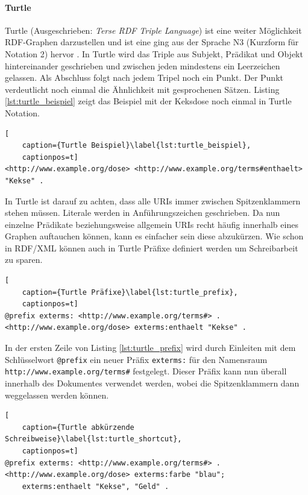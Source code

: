 \paragraph{Turtle} %
\label{par:turtle}

Turtle (Ausgeschrieben: \emph{Terse RDF Triple Language}) ist eine weiter Möglichkeit RDF-Graphen darzustellen und ist eine ging aus der Sprache N3 (Kurzform für Notation 2) hervor \cite{DavidBeckett}. In Turtle wird das Triple aus Subjekt, Prädikat und Objekt hintereinander geschrieben und zwischen jeden mindestens ein Leerzeichen gelassen. Als Abschluss folgt nach jedem Tripel noch ein Punkt. Der Punkt verdeutlicht noch einmal die Ähnlichkeit mit gesprochenen Sätzen. Listing \ref{lst:turtle_beispiel} zeigt das Beispiel mit der Keksdose noch einmal in Turtle Notation. 

\begin{lstlisting}[
    caption={Turtle Beispiel}\label{lst:turtle_beispiel},
    captionpos=t]
<http://www.example.org/dose> <http://www.example.org/terms#enthaelt> "Kekse" .
\end{lstlisting} 

In Turtle ist darauf zu achten, dass alle URIs immer zwischen Spitzenklammern stehen müssen. Literale werden in Anführungszeichen geschrieben. Da nun einzelne Prädikate beziehungsweise allgemein URIs recht häufig innerhalb eines Graphen auftauchen können, kann es einfacher sein diese abzukürzen. Wie schon in RDF/XML können auch in Turtle Präfixe definiert werden um Schreibarbeit zu sparen.

\begin{lstlisting}[
    caption={Turtle Präfixe}\label{lst:turtle_prefix},
    captionpos=t]
@prefix exterms: <http://www.example.org/terms#> .
<http://www.example.org/dose> exterms:enthaelt "Kekse" .   
\end{lstlisting}

In der ersten Zeile von Listing \ref{lst:turtle_prefix} wird durch Einleiten mit dem Schlüsselwort \texttt{@prefix} ein neuer Präfix \texttt{exterms:} für den Namensraum \texttt{http://www.example.org/terms\#} festgelegt. Dieser Präfix kann nun überall innerhalb des Dokumentes verwendet werden, wobei die Spitzenklammern dann weggelassen werden können.

\begin{lstlisting}[
    caption={Turtle abkürzende Schreibweise}\label{lst:turtle_shortcut},
    captionpos=t]
@prefix exterms: <http://www.example.org/terms#> .
<http://www.example.org/dose> exterms:farbe "blau";
    exterms:enthaelt "Kekse", "Geld" .   
\end{lstlisting}

